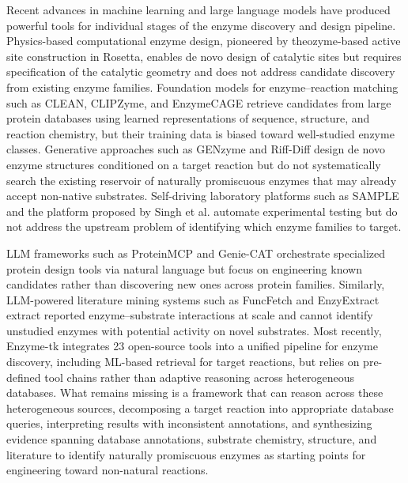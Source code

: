 \documentclass[12pt]{article}
\begin{document}
Recent advances in machine learning and large language models have produced powerful tools for individual stages of the enzyme discovery and design pipeline. Physics-based computational enzyme design, pioneered by theozyme-based active site construction in Rosetta\cite{rothlisberger2008kemp}, enables de novo design of catalytic sites but requires specification of the catalytic geometry and does not address candidate discovery from existing enzyme families. Foundation models for enzyme--reaction matching such as CLEAN\cite{yu2023clean}, CLIPZyme\cite{mikhael2024clipzyme}, and EnzymeCAGE\cite{zheng2026enzymecage} retrieve candidates from large protein databases using learned representations of sequence, structure, and reaction chemistry, but their training data is biased toward well-studied enzyme classes. Generative approaches such as GENzyme\cite{hua2024genzyme} and Riff-Diff\cite{braun2026computational} design de novo enzyme structures conditioned on a target reaction but do not systematically search the existing reservoir of naturally promiscuous enzymes that may already accept non-native substrates. Self-driving laboratory platforms such as SAMPLE\cite{rapp2024selfdriving} and the platform proposed by Singh et al.\cite{singh2025autonomous} automate experimental testing but do not address the upstream problem of identifying which enzyme families to target.

LLM frameworks such as ProteinMCP\cite{xu2026proteinmcp} and Genie-CAT\cite{jacob2025genie} orchestrate specialized protein design tools via natural language but focus on engineering known candidates rather than discovering new ones across protein families. Similarly, LLM-powered literature mining systems such as FuncFetch\cite{smith2025funcfetch} and EnzyExtract\cite{wei2025enzyextract} extract reported enzyme--substrate interactions at scale and cannot identify unstudied enzymes with potential activity on novel substrates. Most recently, Enzyme-tk\cite{mora2026enzymetk} integrates 23 open-source tools into a unified pipeline for enzyme discovery, including ML-based retrieval for target reactions, but relies on pre-defined tool chains rather than adaptive reasoning across heterogeneous databases. What remains missing is a framework that can reason across these heterogeneous sources, decomposing a target reaction into appropriate database queries, interpreting results with inconsistent annotations, and synthesizing evidence spanning database annotations, substrate chemistry, structure, and literature to identify naturally promiscuous enzymes as starting points for engineering toward non-natural reactions.
\end{document}

